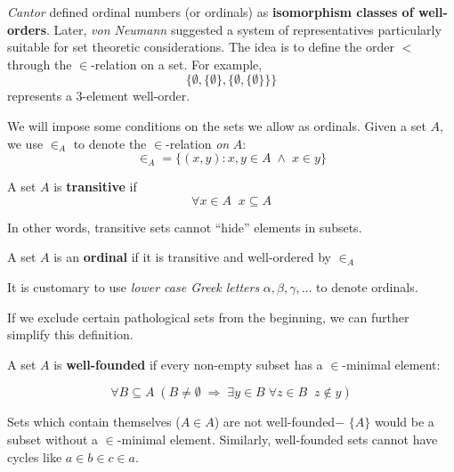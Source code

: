 \textit{Cantor} defined ordinal numbers (or ordinals) as \textbf{isomorphism classes of well-orders}. Later, \textit{von Neumann} suggested a system of representatives particularly suitable for set theoretic considerations. The idea is to define the order $<$ through the $\in$-relation on a set. For example,
\begin{equation}

\{ \emptyset, \{\emptyset\}, \{\emptyset, \{\emptyset\}\}\}
\end{equation}
represents a 3-element well-order.

We will impose some conditions on the sets we allow as ordinals. Given a set $A$, we use $\in_A$ to denote the $\in$-relation \textit{on} $A$:
\begin{equation}

\in_A = \{ (x,y) \colon x,y \in A \; \wedge \; x \in y \}
\end{equation}

\begin{definition}\label{def-transitive}A set $A$ is \textbf{transitive} if
\begin{equation*}
\tag{trans}
    \forall x \in A \; \; x \subseteq A
\end{equation*}
\end{definition}In other words, transitive sets cannot ``hide'' elements in subsets.

\begin{definition}\label{def-ordinal}A set $A$ is an \textbf{ordinal} if it is transitive and well-ordered by $\in_A$

\end{definition}It is customary to use \textit{lower case Greek letters} $\alpha, \beta, \gamma, \dots$ to denote ordinals.

If we exclude certain pathological sets from the beginning, we can further simplify this definition.

\begin{definition}A set $A$ is \textbf{well-founded} if every non-empty subset has a $\in$-minimal element:

\begin{equation}
\forall B \subseteq A \; (B \ne \emptyset \; \Rightarrow \; \exists y \in B \;  \forall z \in B \; \; z \not \in y)
\end{equation}

\end{definition}Sets which contain themselves ($A \in A$) are not well-founded$-$ $\{A\}$ would be a subset without a $\in$-minimal element. Similarly, well-founded sets cannot have cycles like $a \in b \in c \in a$.

